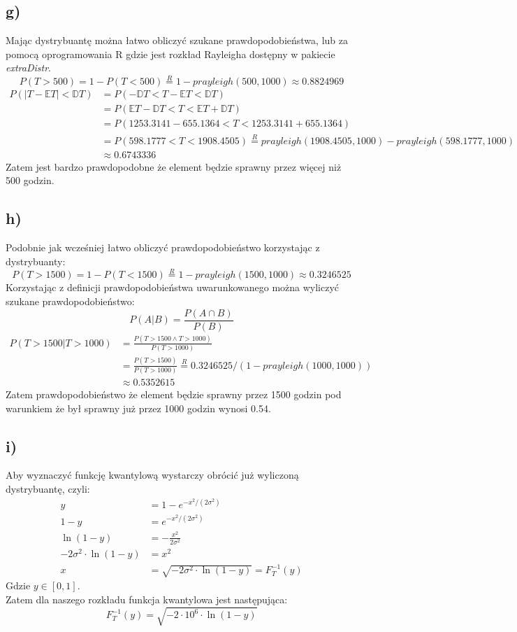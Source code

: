\documentclass{article}
\begin{document}
\subsection{g)}
Mając dystrybuantę można łatwo obliczyć szukane prawdopodobieństwa, lub za pomocą oprogramowania R gdzie jest rozkład Rayleigha dostępny w pakiecie \textit{extraDistr}.
\[ P(T > 500) = 1 - P(T < 500) \overset{R}{=} 1 - prayleigh(500, 1000) \approx 0.8824969 \]
\begin{align*}
P(|T - \mathbb{E}T| < \mathbb{D}T) & = P(-\mathbb{D}T < T - \mathbb{E}T < \mathbb{D}T) \\
& = P(\mathbb{E}T - \mathbb{D}T < T < \mathbb{E}T + \mathbb{D}T) \\
& = P(1253.3141 - 655.1364 < T < 1253.3141 + 655.1364) \\
& = P(598.1777 < T < 1908.4505) \overset{R}{=} prayleigh(1908.4505, 1000) - prayleigh(598.1777, 1000) \\
& \approx 0.6743336
\end{align*}
Zatem jest bardzo prawdopodobne że element będzie sprawny przez więcej niż 500 godzin.

\subsection{h)}
Podobnie jak wcześniej łatwo obliczyć prawdopodobieństwo korzystając z dystrybuanty:
\[ P(T > 1500) = 1 - P(T < 1500) \overset{R}{=} 1 - prayleigh(1500, 1000) \approx 0.3246525 \]
Korzystając z definicji prawdopodobieństwa uwarunkowanego można wyliczyć szukane prawdopodobieństwo:
\[ P(A|B) = \frac{P(A \cap B)}{P(B)} \]
\begin{align*}
P(T > 1500 | T > 1000) & = \frac{P(T > 1500 \wedge T > 1000)}{P(T > 1000)} \\
& = \frac{P(T>1500)}{P(T>1000)} \overset{R}{=} 0.3246525/(1 - prayleigh(1000,1000))\\
& \approx 0.5352615
\end{align*}
Zatem prawdopodobieństwo że element będzie sprawny przez 1500 godzin pod warunkiem że był sprawny już przez 1000 godzin wynosi 0.54.

\subsection{i)}
Aby wyznaczyć funkcję kwantylową wystarczy obrócić już wyliczoną dystrybuantę, czyli:
\begin{align*}
y & = 1 - e^{-x^2 / (2\sigma^2)} \\
1 - y & = e^{-x^2 / (2\sigma^2)} \\
\ln{(1-y)} & = -\frac{x^2}{2\sigma^2} \\
- 2\sigma^2\cdot \ln{(1-y)} & = x^2 \\
x & = \sqrt{- 2\sigma^2 \cdot \ln{(1-y)}} = F^{-1}_T(y)
\end{align*}
Gdzie $y \in [0,1]$. \\
Zatem dla naszego rozkładu funkcja kwantylowa jest następująca:
\[ F^{-1}_T(y) = \sqrt{- 2\cdot10^6 \cdot \ln{(1-y)}} \]
\end{document}
